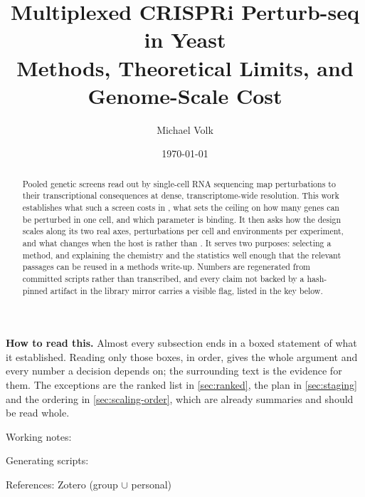 \documentclass[10pt,a4paper]{article}
\title{\vspace{-1.5em}Multiplexed CRISPRi Perturb-seq in Yeast\\
  {\large Methods, Theoretical Limits, and Genome-Scale Cost}}
\author{Michael Volk}
\date{\today}
\begin{document}
\maketitle
\thispagestyle{empty}

\begin{abstract}
\noindent
Pooled genetic screens read out by single-cell RNA sequencing map perturbations
to their transcriptional consequences at dense, transcriptome-wide resolution.
This work establishes what such a screen costs in , what sets
the ceiling on how many genes can be perturbed in one cell, and which parameter
is binding. It then asks how the design scales along its two real axes,
perturbations per cell and environments per experiment, and what changes when the
host is  rather than . It serves two
purposes: selecting a method, and explaining the chemistry and the statistics
well enough that the relevant passages can be reused in a methods write-up.
Numbers are regenerated from committed scripts rather than transcribed, and every
claim not backed by a hash-pinned artifact in the library mirror carries a
visible flag, listed in the key below.
\end{abstract}

\vspace{0.5em}
{\small\color{tcgray}
\textbf{How to read this.} Almost every subsection ends in a boxed statement of what it established. Reading only those boxes, in order, gives the whole argument and every number a decision depends on; the surrounding text is the evidence for them. The exceptions are the ranked list in \cref{sec:ranked}, the plan in \cref{sec:staging} and the ordering in \cref{sec:scaling-order}, which are already summaries and should be read whole.\par\smallskip

Working notes: \par
Generating scripts: \par
References: Zotero  (group $\cup$ personal)\par}

\vspace{1em}
\tccontents

\clearpage







\end{document}
